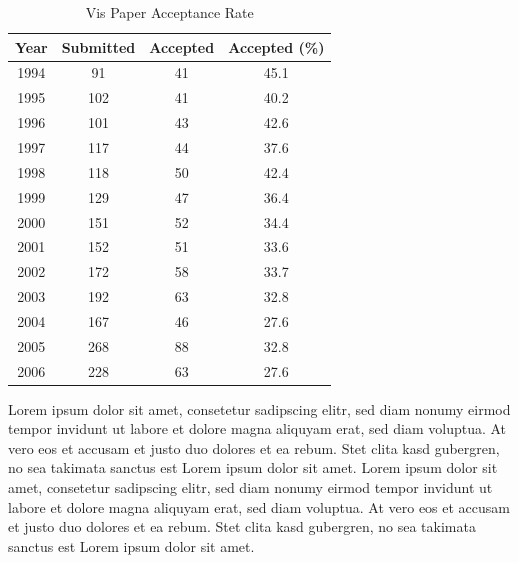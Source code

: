 \documentclass[journal]{vgtc}
\begin{document}
\begin{table}
  \caption{\label{tab:vis_accept} Vis Paper Acceptance Rate}
  \scriptsize
  \begin{center}
    \begin{tabular}{cccc}
      Year & Submitted & Accepted & Accepted (\%)\\
      \hline
      1994 &  91 & 41 & 45.1\\
      1995 & 102 & 41 & 40.2\\
      1996 & 101 & 43 & 42.6\\
      1997 & 117 & 44 & 37.6\\
      1998 & 118 & 50 & 42.4\\
      1999 & 129 & 47 & 36.4\\
      2000 & 151 & 52 & 34.4\\
      2001 & 152 & 51 & 33.6\\
      2002 & 172 & 58 & 33.7\\
      2003 & 192 & 63 & 32.8\\
      2004 & 167 & 46 & 27.6\\
      2005 & 268 & 88 & 32.8\\
      2006 & 228 & 63 & 27.6
    \end{tabular}
  \end{center}
\end{table}


Lorem ipsum dolor sit amet, consetetur sadipscing elitr, sed diam
nonumy eirmod tempor invidunt ut labore et dolore magna aliquyam erat,
sed diam voluptua. At vero eos et accusam et justo duo dolores et ea
rebum. Stet clita kasd gubergren, no sea takimata sanctus est Lorem
ipsum dolor sit amet. Lorem ipsum dolor sit amet, consetetur
sadipscing elitr, sed diam nonumy eirmod tempor invidunt ut labore et
dolore magna aliquyam erat, sed diam voluptua. At vero eos et accusam
et justo duo dolores et ea rebum. Stet clita kasd gubergren, no sea
takimata sanctus est Lorem ipsum dolor sit amet.
\end{document}
